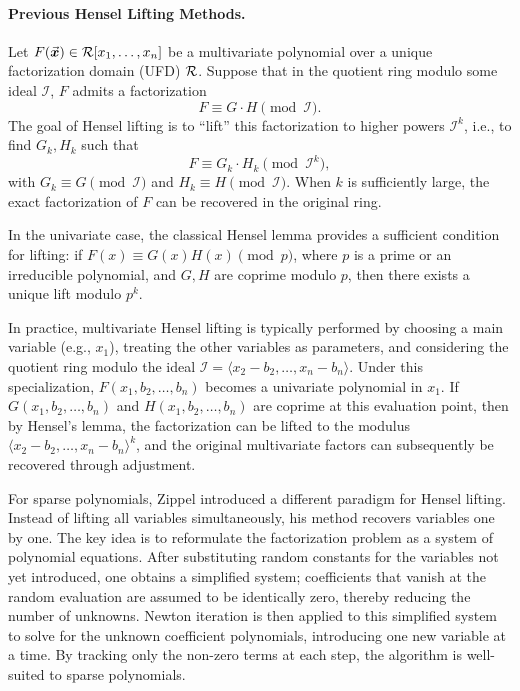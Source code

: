 \documentclass{article}
\numberwithin{equation}{section}
\begin{document}
\paragraph{Previous Hensel Lifting Methods.}
Let \(F(\vec{\boldsymbol{x}}) \in {\mathcal{R}}[x_1, \dots, x_n]\) be a multivariate polynomial over a unique factorization domain (UFD) \({\mathcal{R}}\). Suppose that in the quotient ring modulo some ideal \(\mathcal{I}\), \(F\) admits a factorization
\[
F \equiv G \cdot H \pmod{\mathcal{I}}.
\]
The goal of Hensel lifting is to ``lift'' this factorization to higher powers \(\mathcal{I}^k\), i.e., to find \(G_k, H_k\) such that
\[
F \equiv G_k \cdot H_k \pmod{\mathcal{I}^k},
\]
with \(G_k \equiv G \pmod{\mathcal{I}}\) and \(H_k \equiv H \pmod{\mathcal{I}}\). When \(k\) is sufficiently large, the exact factorization of \(F\) can be recovered in the original ring.

In the univariate case, the classical Hensel lemma provides a sufficient condition for lifting: if \(F(x) \equiv G(x) H(x) \pmod{p}\), where \(p\) is a prime or an irreducible polynomial, and \(G, H\) are coprime modulo $p$, then there exists a unique lift modulo \(p^k\).

In practice, multivariate Hensel lifting is typically performed by choosing a main variable (e.g., \(x_1\)), treating the other variables as parameters, and considering the quotient ring modulo the ideal \(\mathcal{I} = \langle x_2 - b_2, \dots, x_n - b_n \rangle\). Under this specialization, \(F(x_1, b_2, \dots, b_n)\) becomes a univariate polynomial in \(x_1\). 
If \(G(x_1, b_2, \dots, b_n)\) and \(H(x_1, b_2, \dots, b_n)\) are coprime at this evaluation point, then by Hensel's lemma, the factorization can be lifted to the modulus \(\langle x_2 - b_2, \dots, x_n - b_n \rangle^k\), and the original multivariate factors can subsequently be recovered through adjustment.

For sparse polynomials, Zippel \cite{zippel1981} introduced a different paradigm for Hensel lifting. Instead of lifting all variables simultaneously, his method recovers variables one by one. The key idea is to reformulate the factorization problem as a system of polynomial equations. After substituting random constants for the variables not yet introduced, one obtains a simplified system; coefficients that vanish at the random evaluation are assumed to be identically zero, thereby reducing the number of unknowns. Newton iteration is then applied to this simplified system to solve for the unknown coefficient polynomials, introducing one new variable at a time. By tracking only the non-zero terms at each step, the algorithm is well-suited to sparse polynomials.
\end{document}
